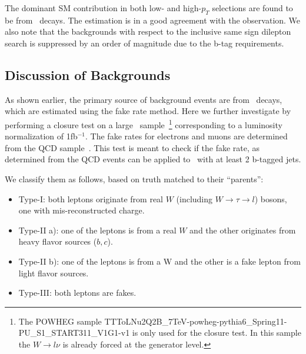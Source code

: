 The dominant SM contribution in both low- and high-$p_T$ selections are found to be from \ttbar\ decays. The estimation
is in a good agreement with the observation. We also note that the backgrounds with respect to the inclusive same sign
dilepton search is suppressed by an order of magnitude due to the b-tag requirements.

\subsection{Discussion of Backgrounds}
\label{bkgdiscussion}

As shown earlier, the primary source of background events are from \ttbar\ decays, which are estimated using the fake rate method. Here we further investigate 
by performing a closure test on a large \ttbar\ sample~\footnote{The POWHEG sample TTToLNu2Q2B\_7TeV-powheg-pythia6\_Spring11-PU\_S1\_START311\_V1G1-v1 is only used for the 
closure test. In this sample the $W \rightarrow l \nu$ is already forced at the generator level.} corresponding to a luminosity normalization of 1fb$^{-1}$. The fake 
rates for electrons and muons are determined from the QCD sample~\cite{ssnote2011}. This test is meant to check if the fake rate, as determined from the QCD events 
can be applied to \ttbar\ with at least 2 b-tagged jets. 

We classify them as follows, based on truth matched to their ``parents'':
\begin{itemize}
\item Type-I: both leptons originate from real $W$ (including $W \rightarrow \tau \rightarrow l$) bosons, one with 
mis-reconstructed charge.
\item Type-II a): one of the leptons is from a real $W$ and the other originates from heavy flavor sources ($b,c$).
\item Type-II b): one of the leptons is from a W and the other is a fake lepton from light flavor sources.
\item Type-III: both leptons are fakes.
\end{itemize} 


